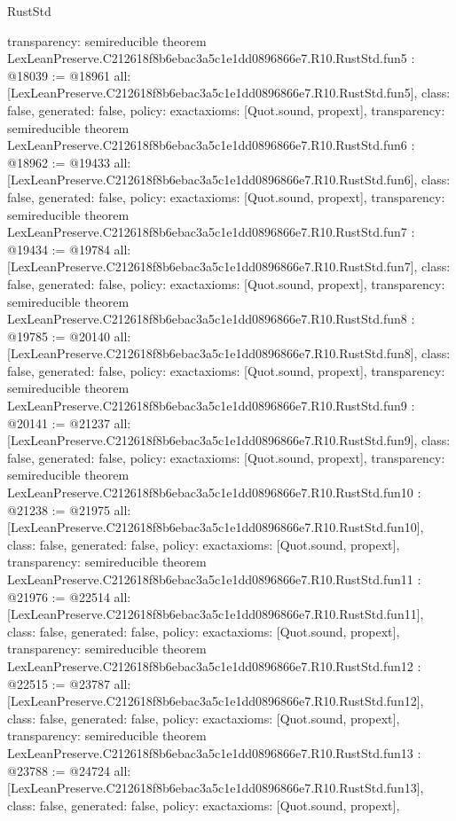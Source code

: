 \begin{lexlean}{RustStd}
\begin{coremodule}
{  transparency: semireducible
}
theorem LexLeanPreserve.C212618f8b6ebac3a5c1e1dd0896866e7.R10.RustStd.fun5 : @18039 := @18961 {
  all: [LexLeanPreserve.C212618f8b6ebac3a5c1e1dd0896866e7.R10.RustStd.fun5],
  class: false,
  generated: false,
  policy: exact{axioms: [Quot.sound, propext]},
  transparency: semireducible
}
theorem LexLeanPreserve.C212618f8b6ebac3a5c1e1dd0896866e7.R10.RustStd.fun6 : @18962 := @19433 {
  all: [LexLeanPreserve.C212618f8b6ebac3a5c1e1dd0896866e7.R10.RustStd.fun6],
  class: false,
  generated: false,
  policy: exact{axioms: [Quot.sound, propext]},
  transparency: semireducible
}
theorem LexLeanPreserve.C212618f8b6ebac3a5c1e1dd0896866e7.R10.RustStd.fun7 : @19434 := @19784 {
  all: [LexLeanPreserve.C212618f8b6ebac3a5c1e1dd0896866e7.R10.RustStd.fun7],
  class: false,
  generated: false,
  policy: exact{axioms: [Quot.sound, propext]},
  transparency: semireducible
}
theorem LexLeanPreserve.C212618f8b6ebac3a5c1e1dd0896866e7.R10.RustStd.fun8 : @19785 := @20140 {
  all: [LexLeanPreserve.C212618f8b6ebac3a5c1e1dd0896866e7.R10.RustStd.fun8],
  class: false,
  generated: false,
  policy: exact{axioms: [Quot.sound, propext]},
  transparency: semireducible
}
theorem LexLeanPreserve.C212618f8b6ebac3a5c1e1dd0896866e7.R10.RustStd.fun9 : @20141 := @21237 {
  all: [LexLeanPreserve.C212618f8b6ebac3a5c1e1dd0896866e7.R10.RustStd.fun9],
  class: false,
  generated: false,
  policy: exact{axioms: [Quot.sound, propext]},
  transparency: semireducible
}
theorem LexLeanPreserve.C212618f8b6ebac3a5c1e1dd0896866e7.R10.RustStd.fun10 : @21238 := @21975 {
  all: [LexLeanPreserve.C212618f8b6ebac3a5c1e1dd0896866e7.R10.RustStd.fun10],
  class: false,
  generated: false,
  policy: exact{axioms: [Quot.sound, propext]},
  transparency: semireducible
}
theorem LexLeanPreserve.C212618f8b6ebac3a5c1e1dd0896866e7.R10.RustStd.fun11 : @21976 := @22514 {
  all: [LexLeanPreserve.C212618f8b6ebac3a5c1e1dd0896866e7.R10.RustStd.fun11],
  class: false,
  generated: false,
  policy: exact{axioms: [Quot.sound, propext]},
  transparency: semireducible
}
theorem LexLeanPreserve.C212618f8b6ebac3a5c1e1dd0896866e7.R10.RustStd.fun12 : @22515 := @23787 {
  all: [LexLeanPreserve.C212618f8b6ebac3a5c1e1dd0896866e7.R10.RustStd.fun12],
  class: false,
  generated: false,
  policy: exact{axioms: [Quot.sound, propext]},
  transparency: semireducible
}
theorem LexLeanPreserve.C212618f8b6ebac3a5c1e1dd0896866e7.R10.RustStd.fun13 : @23788 := @24724 {
  all: [LexLeanPreserve.C212618f8b6ebac3a5c1e1dd0896866e7.R10.RustStd.fun13],
  class: false,
  generated: false,
  policy: exact{axioms: [Quot.sound, propext]},
}
\end{coremodule}
\end{lexlean}
